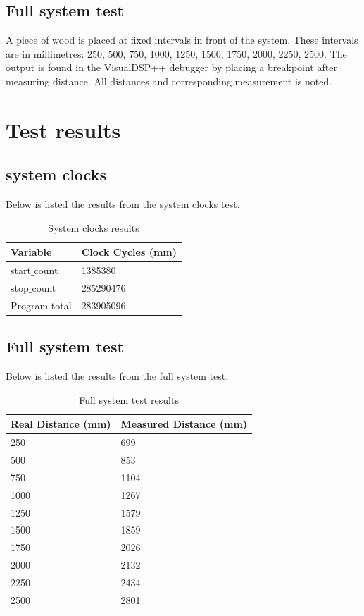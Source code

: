 \subsection{Full system test}
A piece of wood is placed at fixed intervals in front of the system. These intervals are in millimetres: 250, 500, 750, 1000, 1250, 1500, 1750, 2000, 2250, 2500. The output is found in the VisualDSP++ debugger by placing a breakpoint after measuring distance. All distances and corresponding measurement is noted.
\section{Test results}
\subsection{system clocks}
Below is listed the results from the system clocks test.
\begin{table}[H]
\centering
    \begin{tabular}{|l|l|}
    \hline
    Variable           & Clock Cycles (mm) \\ \hline
    start$\_$count        & 1385380           \\ \hline
    stop$\_$count         & 285290476         \\ \hline
    Program total      & 283905096         \\ \hline
    \end{tabular}
    \caption{System clocks results}
\end{table}
\subsection{Full system test}
Below is listed the results from the full system test.
\begin{table}[H]
\centering
    \begin{tabular}{|l|l|}
    \hline
    Real Distance (mm) & Measured Distance (mm) \\ \hline
    250                & 699                    \\ \hline
    500                & 853                    \\ \hline
    750                & 1104                   \\ \hline
    1000               & 1267                   \\ \hline
    1250               & 1579                   \\ \hline
    1500               & 1859                   \\ \hline
    1750               & 2026                   \\ \hline
    2000               & 2132                   \\ \hline
    2250               & 2434                   \\ \hline
    2500               & 2801                   \\ \hline
    \end{tabular}
    \caption{Full system test results}
\end{table}
